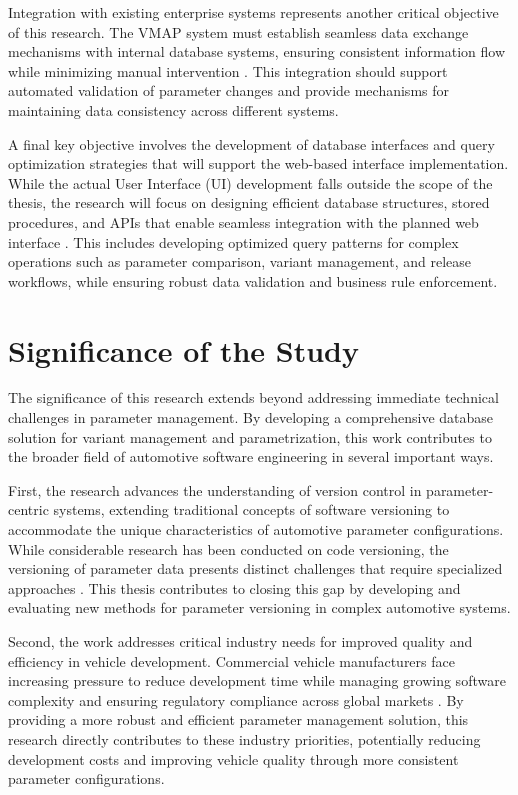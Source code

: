 Integration with existing enterprise systems represents another critical objective of this research. The VMAP system must establish seamless data exchange mechanisms with internal database systems, ensuring consistent information flow while minimizing manual intervention \cite{broy2006challenges}. This integration should support automated validation of parameter changes and provide mechanisms for maintaining data consistency across different systems.

A final key objective involves the development of database interfaces and query optimization strategies that will support the web-based interface implementation. While the actual User Interface (UI) development falls outside the scope of the thesis, the research will focus on designing efficient database structures, stored procedures, and APIs that enable seamless integration with the planned web interface \cite{pretschner2007software}. This includes developing optimized query patterns for complex operations such as parameter comparison, variant management, and release workflows, while ensuring robust data validation and business rule enforcement.

\section{Significance of the Study}
\label{sec:significance}

The significance of this research extends beyond addressing immediate technical challenges in parameter management. By developing a comprehensive database solution for variant management and parametrization, this work contributes to the broader field of automotive software engineering in several important ways.

First, the research advances the understanding of version control in parameter-centric systems, extending traditional concepts of software versioning to accommodate the unique characteristics of automotive parameter configurations. While considerable research has been conducted on code versioning, the versioning of parameter data presents distinct challenges that require specialized approaches \cite{bhattacherjee2015principles}. This thesis contributes to closing this gap by developing and evaluating new methods for parameter versioning in complex automotive systems.

Second, the work addresses critical industry needs for improved quality and efficiency in vehicle development. Commercial vehicle manufacturers face increasing pressure to reduce development time while managing growing software complexity and ensuring regulatory compliance across global markets \cite{broy2006challenges}. By providing a more robust and efficient parameter management solution, this research directly contributes to these industry priorities, potentially reducing development costs and improving vehicle quality through more consistent parameter configurations.

